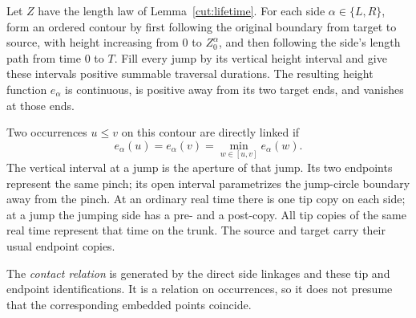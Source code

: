 \begin{definition}
\label{cut:contact-relation}
Let $Z$ have the length law of Lemma~\ref{cut:lifetime}.  For each side
$\alpha\in\{L,R\}$, form an ordered contour by first following the original
boundary from target to source, with height increasing from $0$ to
$Z^\alpha_0$, and then following the side's length path from time $0$ to
$T$.  Fill every jump by its vertical height interval and give these
intervals positive summable traversal durations.  The resulting height
function $e_\alpha$ is continuous, is positive away from its two target
ends, and vanishes at those ends.

Two occurrences $u\leq v$ on this contour are directly linked if
\[
 e_\alpha(u)=e_\alpha(v)
       =\min_{w\in[u,v]}e_\alpha(w).
\]
The vertical interval at a jump is the aperture of that jump.  Its two
endpoints represent the same pinch; its open interval parametrizes the
jump-circle boundary away from the pinch.  At an ordinary real time there
is one tip copy on each side; at a jump the jumping side has a pre- and a
post-copy.  All tip copies of the same real time represent that time on
the trunk.  The source and target carry their usual endpoint copies.

The \emph{contact relation} is generated by the direct side linkages and
these tip and endpoint identifications.  It is a relation on occurrences,
so it does not presume that the corresponding embedded points coincide.
\end{definition}

